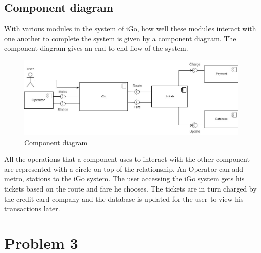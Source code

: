 \documentclass{article}
\begin{document}
\subsection{Component diagram}
With various modules in the system of iGo, how well these modules interact with one another to complete the system is given by a component diagram. The component diagram gives an end-to-end flow of the system.
\begin{figure}[h]
    \centering
    \includegraphics[scale=0.5]{component diagram.jpg}
    \caption{Component diagram}
    \label{fig:component}
\end{figure}
\pagebreak
All the operations that a component uses to interact with the other component are represented with a circle on top of the relationship. An Operator can add metro, stations to the iGo system. The user accessing the iGo system gets his tickets based on the route and fare he chooses. The tickets are in turn charged by the credit card company and the database is updated for the user to view his transactions later. 
\pagebreak
\section{Problem 3}
\end{document}
